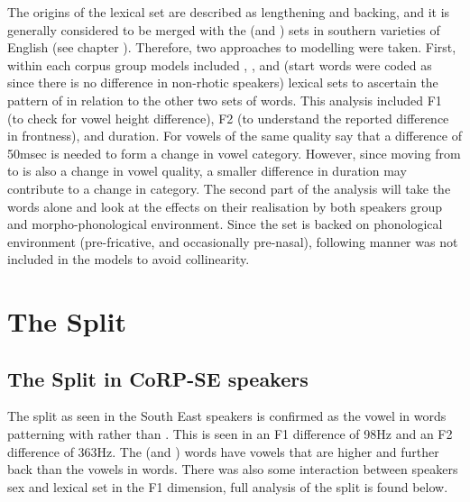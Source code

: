 \documentclass[../../../00.FullDoc/tex/APRReport-year4]{subfiles}
\begin{document}
The origins of the \bath{} lexical set are described as lengthening and backing, and it is generally considered to be merged with the \palm{} (and ) sets in southern varieties of English (see chapter \notinsubfile{\ref{ch:LitReviewSocio}}). Therefore, two approaches to modelling were taken. First, within each corpus group models included \trap{}, \bath{}, and \palm{} (start words were coded as \palm{} since there is no difference in non-rhotic speakers) lexical sets to ascertain the pattern of \bath{} in relation to the other two sets of words. This analysis included F1 (to check for vowel height difference), F2 (to understand the reported difference in frontness), and duration. For vowels of the same quality \cite{Labov2006} say that a difference of 50msec is needed to form a change in vowel category. However, since \bath{} moving from \trap{} to \palm{} is also a change in vowel quality, a smaller difference in duration may contribute to a change in category. The second part of the analysis will take the \bath{} words alone and look at the effects on their realisation by both speakers group and morpho-phonological environment. Since the \bath{} set is backed on phonological environment (pre-fricative, and occasionally pre-nasal), following manner was not included in the models to avoid collinearity.

	
\section{The Split} \label{sec:TBSplit}
\subsection{The Split in CoRP-SE speakers}
The \TB{} split as seen in the South East speakers is confirmed as the vowel in \bath{} words patterning with \palm{} rather than \trap{}. This is seen in an F1 difference of 98Hz and an F2 difference of  363Hz. The \bath{} (and \palm{}) words have vowels that are higher and further back than the vowels in \trap{} words.  There was also some interaction between speakers sex and lexical set in the F1 dimension, full analysis of the split is found below.
\end{document}
